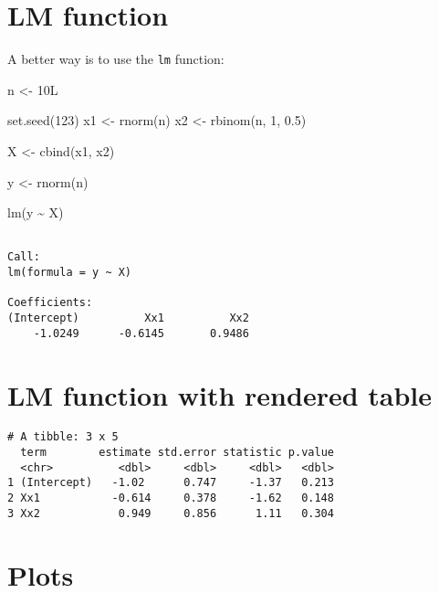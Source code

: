 \documentclass[letterpaper,twoside,12pt]{article}
\newenvironment{Shaded}{\begin{snugshade}}{\end{snugshade}}
\newcommand{\DecValTok}[1]{\textcolor[rgb]{0.00,0.00,0.81}{#1}}
\newcommand{\FloatTok}[1]{\textcolor[rgb]{0.00,0.00,0.81}{#1}}
\newcommand{\FunctionTok}[1]{\textcolor[rgb]{0.00,0.00,0.00}{#1}}
\newcommand{\NormalTok}[1]{#1}
\newcommand{\OtherTok}[1]{\textcolor[rgb]{0.56,0.35,0.01}{#1}}
\newcommand{\SpecialCharTok}[1]{\textcolor[rgb]{0.00,0.00,0.00}{#1}}
\begin{document}
\section{LM function}\label{lm-function}

A better way is to use the \texttt{lm} function:

\begin{Shaded}
\begin{Highlighting}[]
\NormalTok{n }\OtherTok{\textless{}{-}} \DecValTok{10}\NormalTok{L}

\FunctionTok{set.seed}\NormalTok{(}\DecValTok{123}\NormalTok{)}
\NormalTok{x1 }\OtherTok{\textless{}{-}} \FunctionTok{rnorm}\NormalTok{(n)}
\NormalTok{x2 }\OtherTok{\textless{}{-}} \FunctionTok{rbinom}\NormalTok{(n, }\DecValTok{1}\NormalTok{, }\FloatTok{0.5}\NormalTok{)}

\NormalTok{X }\OtherTok{\textless{}{-}} \FunctionTok{cbind}\NormalTok{(x1, x2)}

\NormalTok{y }\OtherTok{\textless{}{-}} \FunctionTok{rnorm}\NormalTok{(n)}

\FunctionTok{lm}\NormalTok{(y }\SpecialCharTok{\textasciitilde{}}\NormalTok{ X)}
\end{Highlighting}
\end{Shaded}

\begin{verbatim}

Call:
lm(formula = y ~ X)

Coefficients:
(Intercept)          Xx1          Xx2  
    -1.0249      -0.6145       0.9486  
\end{verbatim}

\section{LM function with rendered
table}\label{lm-function-with-rendered-table}

\begin{verbatim}
# A tibble: 3 x 5
  term        estimate std.error statistic p.value
  <chr>          <dbl>     <dbl>     <dbl>   <dbl>
1 (Intercept)   -1.02      0.747     -1.37   0.213
2 Xx1           -0.614     0.378     -1.62   0.148
3 Xx2            0.949     0.856      1.11   0.304
\end{verbatim}

\section{Plots}\label{plots}
\end{document}

